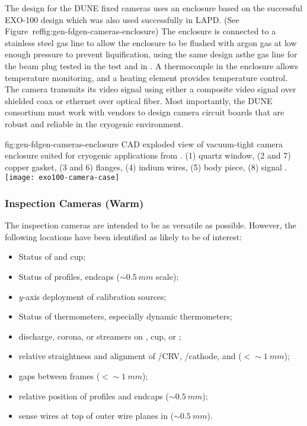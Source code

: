 The design for the DUNE fixed cameras uses an enclosure based on
the successful EXO-100 design\cite{Delaquis:2013hva} which was also
used successfully in
LAPD. (See Figure~ref{fig:gen-fdgen-cameras-enclosure}) The enclosure is
 connected to a stainless steel gas line to allow the enclosure to be
flushed with argon gas at low enough pressure to prevent
liquification, using the same design asthe gas line for the beam plug
tested in the   test and in .  A thermocouple in the
enclosure allows temperature monitoring, and a heating element
provides temperature control.  The camera transmits its video
signal using either a composite video signal over shielded coax or
ethernet over optical fiber.  Most importantly, the DUNE 
consortium must work with vendors to design camera circuit boards that
are robust and reliable in the cryogenic environment.

\begin{dunefigure}{fig:gen-fdgen-cameras-enclosure}
  {CAD exploded view of vacuum-tight camera enclosure suited for cryogenic applications from \cite{Delaquis:2013hva}.
    (1) quartz window, (2 and 7) copper gasket, (3 and 6) flanges, (4) indium wires, (5) body piece, (8) signal \fdth.
  }
  \texttt{[image: exo100-camera-case]}%
\end{dunefigure}



\subsubsection{Inspection Cameras (Warm)}

The inspection cameras are intended to be as versatile as possible.
However, the following locations have been identified as likely
to be of interest:
\begin{itemize}
\item Status of  \fdth and cup;
\item Status of profiles, endcaps (\(\sim\SI{0.5}{mm}\) scale);
\item $y$-axis deployment of calibration sources;
\item Status of thermometers, especially dynamic thermometers;
\item {} discharge, corona, or streamers on  \fdth, cup, or ;
\item relative straightness and alignment of /CRV, /cathode, and  (\(<\sim\SI{1}{mm}\));
\item gaps between  frames (\(<\sim\SI{1}{mm}\));
\item relative position of profiles and endcaps (\(\sim\SI{0.5}{mm}\));
\item sense wires at top of outer wire planes in \single {} (\(\sim\SI{0.5}{mm}\)).
\end{itemize}

